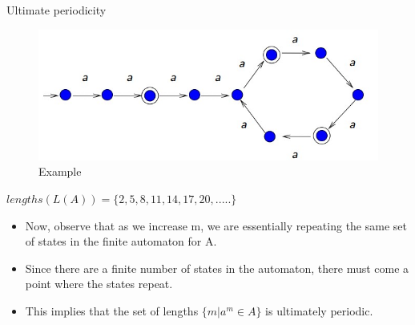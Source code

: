 \documentclass{beamer}
\begin{document}
\begin{frame}{Ultimate periodicity}

\begin{figure}
	\includegraphics[scale=.35]{img2/m10}
	\caption{Example}
\end{figure}
$lengths(L(A)) = \{2,5,8,11,14,17,20, . . . . .\}$
\begin{itemize}
	\item Now, observe that as we increase m, we are essentially repeating the same set of states in the finite automaton for A. 
	\item Since there are a finite number of states in the automaton, there must come a point where the states repeat. 
	\item This implies that the set of lengths $\{m | a^m \in A\}$ is ultimately periodic.
\end{itemize}
\end{frame}
\end{document}
